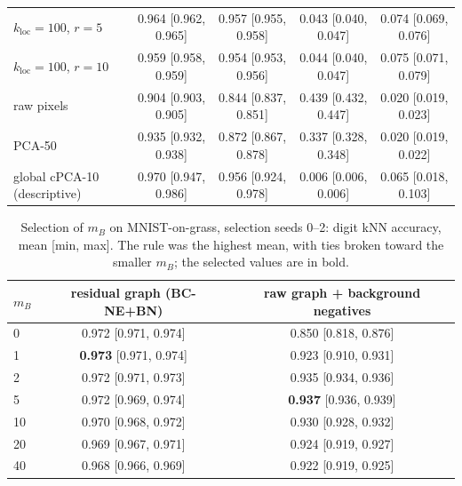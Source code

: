 \documentclass[10pt]{article}
\newcommand{\methodname}{BC-NE}
\newcommand{\BN}{\methodname{}+BN}
\newcommand{\kloc}{k_{\mathrm{loc}}}
\begin{document}
\begin{table}[ht]
{\begin{tabular}{lcccc}
  $\kloc=100$, $r=5$ & 0.964 [0.962, 0.965] & 0.957 [0.955, 0.958] & 0.043 [0.040, 0.047] & 0.074 [0.069, 0.076] \\
  $\kloc=100$, $r=10$ & 0.959 [0.958, 0.959] & 0.954 [0.953, 0.956] & 0.044 [0.040, 0.047] & 0.075 [0.071, 0.079] \\
  \midrule
  raw pixels & 0.904 [0.903, 0.905] & 0.844 [0.837, 0.851] & 0.439 [0.432, 0.447] & 0.020 [0.019, 0.023] \\
  PCA-50 & 0.935 [0.932, 0.938] & 0.872 [0.867, 0.878] & 0.337 [0.328, 0.348] & 0.020 [0.019, 0.022] \\
  global cPCA-10 (descriptive) & 0.970 [0.947, 0.986] & 0.956 [0.924, 0.978] & 0.006 [0.006, 0.006] & 0.065 [0.018, 0.103] \\
  \bottomrule
\end{tabular}}
\end{table}

\begin{table}[ht]
\centering
\small
\caption{Selection of $m_B$ on MNIST-on-grass, selection seeds 0--2: digit kNN accuracy, mean [min, max]. The rule was the highest mean, with ties broken toward the smaller $m_B$; the selected values are in bold.}
\label{tab:mb}
\begin{tabular}{lcc}
  \toprule
  $m_B$ & residual graph (\BN{}) & raw graph + background negatives \\
  \midrule
  0 & 0.972 [0.971, 0.974] & 0.850 [0.818, 0.876] \\
  1 & \textbf{0.973} [0.971, 0.974] & 0.923 [0.910, 0.931] \\
  2 & 0.972 [0.971, 0.973] & 0.935 [0.934, 0.936] \\
  5 & 0.972 [0.969, 0.974] & \textbf{0.937} [0.936, 0.939] \\
  10 & 0.970 [0.968, 0.972] & 0.930 [0.928, 0.932] \\
  20 & 0.969 [0.967, 0.971] & 0.924 [0.919, 0.927] \\
  40 & 0.968 [0.966, 0.969] & 0.922 [0.919, 0.925] \\
  \bottomrule
\end{tabular}
\end{table}
\end{document}

